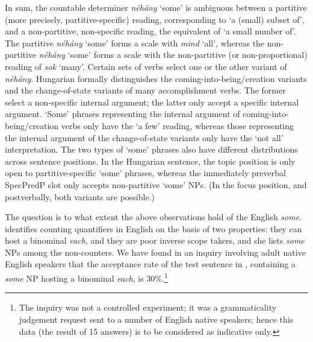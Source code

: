 \documentclass[output=paper]{langscibook}
\begin{document}
\eal
{}
\zl

\noindent In sum, the countable determiner \textit{néhány} `some' is ambiguous between a partitive (more precisely, partitive-specific) reading, corresponding to ‘a (small) subset of’, and a non-partitive, non-specific reading, the equivalent of `a small number of'. The partitive \textit{néhány} `some' forms a scale with \textit{mind} `all', whereas the non-partitive \textit{néhány} `some' forms a scale with the non-partitive (or non-proportional) reading of \textit{sok} ‘many’. Certain sets of verbs select one or the other variant of \textit{néhány}. Hungarian formally distinguishes the coming-into-being/creation variants and the change-of-state variants of many accomplishment verbs. The former select a non-specific internal argument; the latter only accept a specific internal argument. `Some' phrases representing the internal argument of coming-into-being/creation verbs only have the ‘a few’ reading, whereas those representing the internal argument of the change-of-state variants only have the ‘not all’ interpretation. The two types of `some' phrases also have different distributions across sentence positions. In the Hungarian sentence, the topic position is only open to partitive-specific `some' phrases, whereas the immediately preverbal SpecPredP slot only accepts non-partitive `some' NPs. (In the focus position, and postverbally, both variants are possible.) 

The question is to what extent the above observations hold of the English \textit{some}. \cite[173]{szabolcsi2010quant} identifies counting quantifiers in English on the basis of two properties: they can host a binominal \textit{each}, and they are poor inverse scope takers, and she lists \textit{some} NPs among the non-counters. We have found in an inquiry involving adult native English speakers that the acceptance rate of the test sentence in , containing a \textit{some} NP hosting a binominal \textit{each}, is 30\%.\footnote{The inquiry was not a controlled experiment; it was a grammaticality judgement request sent to a number of English native speakers; hence this data (the result of 15 answers) is to be considered as indicative only.}
\end{document}
